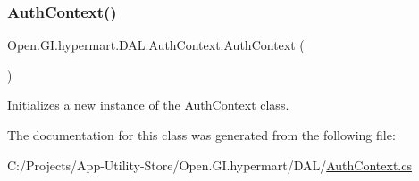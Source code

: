 \subsubsection{\texorpdfstring{Auth\+Context()}{AuthContext()}}
{\footnotesize\ttfamily Open.\+G\+I.\+hypermart.\+D\+A\+L.\+Auth\+Context.\+Auth\+Context (\begin{DoxyParamCaption}{ }\end{DoxyParamCaption})}



Initializes a new instance of the \hyperlink{class_open_1_1_g_i_1_1hypermart_1_1_d_a_l_1_1_auth_context}{Auth\+Context} class. 



The documentation for this class was generated from the following file\+:\begin{DoxyCompactItemize}
\item 
C\+:/\+Projects/\+App-\/\+Utility-\/\+Store/\+Open.\+G\+I.\+hypermart/\+D\+A\+L/\hyperlink{_auth_context_8cs}{Auth\+Context.\+cs}\end{DoxyCompactItemize}
